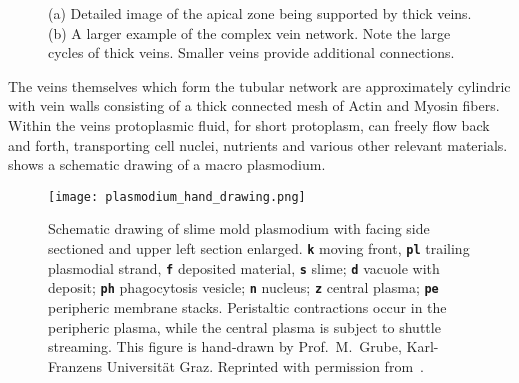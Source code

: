 		
		\begin{figure}[!htbp]
			\centering
			\qquad
			\caption[Details of apical zone and supporting network]{(a) Detailed image of the apical zone being supported by thick veins. (b) A larger example of the complex vein network. Note the large cycles of thick veins. Smaller veins provide additional connections.}
			\label{fig:plasmodium_details}
		\end{figure}

		
	
		The veins themselves which form the tubular network are approximately cylindric with vein walls consisting of a thick connected mesh of Actin and Myosin fibers. Within the veins protoplasmic fluid, for short protoplasm, can freely flow back and forth, transporting cell nuclei, nutrients and various other relevant materials.  shows a schematic drawing of a macro plasmodium.

		\begin{figure}[!htb]
			\centering
			\texttt{[image: plasmodium\_hand\_drawing.png]}
			\caption[Schematic drawing of the plasmodium of \P]{Schematic drawing of slime mold plasmodium with facing side sectioned and upper left section enlarged. \textbf{\texttt{k}} moving front, \textbf{\texttt{pl}} trailing plasmodial strand, \textbf{\texttt{f}} deposited material, \textbf{\texttt{s}} slime; \textbf{\texttt{d}} vacuole with deposit; \textbf{\texttt{ph}} phagocytosis vesicle; \textbf{\texttt{n}} nucleus; \textbf{\texttt{z}} central plasma; \textbf{\texttt{pe}} peripheric membrane stacks. Peristaltic contractions occur in the peripheric plasma, while the central plasma is subject to shuttle streaming. This figure is hand-drawn by Prof.~M.~Grube, Karl-Franzens Universit\"at Graz. Reprinted with permission from~\cite{grube2016physarum}.}
			\label{fig:plasmodium_hand_drawing}
		\end{figure}

